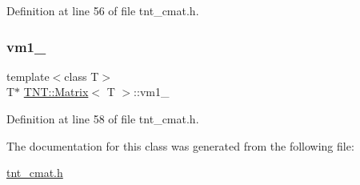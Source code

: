 Definition at line 56 of file tnt\+\_\+cmat.\+h.

\mbox{\label{classTNT_1_1Matrix_a7bee192ea8a850399382ff79c9d176bf}} 
\subsubsection{\texorpdfstring{vm1\+\_\+}{vm1\_}}
{\footnotesize\ttfamily template$<$class T$>$ \\
T$\ast$ \hyperlink{classTNT_1_1Matrix}{T\+N\+T\+::\+Matrix}$<$ T $>$\+::vm1\+\_\+\hspace{0.3cm}{\ttfamily [protected]}}



Definition at line 58 of file tnt\+\_\+cmat.\+h.



The documentation for this class was generated from the following file\+:\begin{DoxyCompactItemize}
\item 
\hyperlink{tnt__cmat_8h}{tnt\+\_\+cmat.\+h}\end{DoxyCompactItemize}
